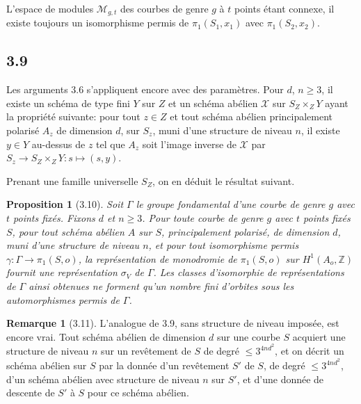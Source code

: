 \documentclass[12pt,a4paper]{article}
\theoremstyle{plain}
\newtheorem{proposition}{Proposition}[section]
\theoremstyle{definition}
\newtheorem{remark}{Remarque}[section]
\newcommand{\ZZ}{\mathbb{Z}}
\begin{document}
L'espace de modules $\mathcal{M}_{g,t}$ des courbes de genre $g$ \`{a} $t$ points \'{e}tant connexe, il existe toujours un isomorphisme permis de $\pi_{1}(S_{1}, x_{1})$ avec $\pi_{1}(S_{2}, x_{2})$.

\subsection*{3.9}
Les arguments 3.6 s'appliquent encore avec des param\`{e}tres. Pour $d$, $n \geq 3$, il existe un sch\'{e}ma de type fini $Y$ sur $Z$ et un sch\'{e}ma ab\'{e}lien $\mathcal{X}$ sur $S_{Z} \times_{Z} Y$ ayant la propri\'{e}t\'{e} suivante: pour tout $z \in Z$ et tout sch\'{e}ma ab\'{e}lien principalement polaris\'{e} $A_{z}$ de dimension $d$, sur $S_{z}$, muni d'une structure de niveau $n$, il existe $y \in Y$ au-dessus de $z$ tel que $A_{z}$ soit l'image inverse de $\mathcal{X}$ par $S_{z} \to S_{Z} \times_{Z} Y : s \mapsto (s, y)$.

Prenant une famille universelle $S_{Z}$, on en d\'{e}duit le r\'{e}sultat suivant.

\begin{proposition}[3.10]
Soit $\Gamma$ le groupe fondamental d'une courbe de genre $g$ avec $t$ points fix\'{e}s. Fixons $d$ et $n \geq 3$. Pour toute courbe de genre $g$ avec $t$ points fix\'{e}s $S$, pour tout sch\'{e}ma ab\'{e}lien $A$ sur $S$, principalement polaris\'{e}, de dimension $d$, muni d'une structure de niveau $n$, et pour tout isomorphisme permis $\gamma : \Gamma \to \pi_{1}(S,o)$, la repr\'{e}sentation de monodromie de $\pi_{1}(S,o)$ sur $H^{1}(A_{o}, \ZZ)$ fournit une repr\'{e}sentation $\sigma_{V}$ de $\Gamma$. Les classes d'isomorphie de repr\'{e}sentations de $\Gamma$ ainsi obtenues ne forment qu'un nombre fini d'orbites sous les automorphismes permis de $\Gamma$.
\end{proposition}

\begin{remark}[3.11]
L'analogue de 3.9, sans structure de niveau impos\'{e}e, est encore vrai. Tout sch\'{e}ma ab\'{e}lien de dimension $d$ sur une courbe $S$ acquiert une structure de niveau $n$ sur un rev\^{e}tement de $S$ de degr\'{e} $\leq 3^{4nd^{2}}$, et on d\'{e}crit un sch\'{e}ma ab\'{e}lien sur $S$ par la donn\'{e}e d'un rev\^{e}tement $S'$ de $S$, de degr\'{e} $\leq 3^{4nd^{2}}$, d'un sch\'{e}ma ab\'{e}lien avec structure de niveau $n$ sur $S'$, et d'une donn\'{e}e de descente de $S'$ \`{a} $S$ pour ce sch\'{e}ma ab\'{e}lien.
\end{remark}
\end{document}
